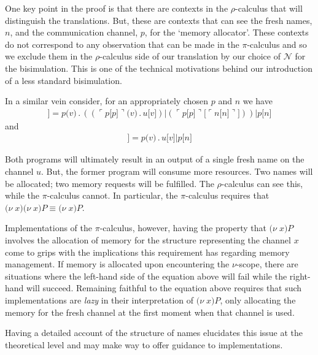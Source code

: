\documentclass[]{entcs}
\newcommand{\ldb}{[\![}
\newcommand{\rdb}{]\!]}
\newcommand{\lpquote}{\ulcorner}
\newcommand{\rpquote}{\urcorner}
\newcommand{\newkw}{\nu}
\newcommand{\id}[1]{\texttt{#1}}
\newcommand{\juxtap}{\mathbin{\id{|}}}
\newcommand{\concat}{\mathbin{.}}
\newcommand{\binpar}[2]{#1 \juxtap #2}
\newcommand{\outputp}[2]{#1 \id{[} #2 \id{]}}
\newcommand{\prefix}[3]{#1 \id{(} #2 \id{)} \concat #3}
\newcommand{\quotep}[1]{\lpquote #1 \rpquote}
\newcommand{\newp}[2]{\id{(}\newkw \; #1 \id{)} #2}
\newcommand{\meaningof}[1]{\ldb #1 \rdb}
\newcommand{\pic}{$\pi$-calculus}
\newcommand{\rhoc}{$\rho$-calculus}
\begin{document}
One key point in the proof is that there are contexts in the {\rhoc}
that will distinguish the translations. But, these are contexts that
can see the fresh names, $n$, and the communication channel, $p$, for
the `memory allocator'. These contexts do not correspond to any
observation that can be made in the {\pic} and so we exclude them in
the {\rhoc} side of our translation by our choice of ${\mathcal N}$
for the bisimulation. This is one of the technical motivations behind
our introduction of a less standard bisimulation.

\begin{example}
	In a similar vein consider, for an appropriately chosen $p$ and $n$ we have
	\begin{eqnarray}
		\meaningof{\newp{v}{\newp{v}{\outputp{u}{v}}}} = 
			\binpar{\prefix{p}{v}{(\binpar{(\prefix{\quotep{\outputp{p}{p}}}{v}{\outputp{u}{v}})}
					              {(\outputp{\quotep{\outputp{p}{p}}}{\quotep{\outputp{n}{n}}})})}}
			       {\outputp{p}{n}} \nonumber
	\end{eqnarray}
	and
	\begin{eqnarray}
		\meaningof{\newp{v}{\outputp{u}{v}}} = 
				\binpar	{\prefix{p}{v}{\outputp{u}{v}}}
			       		{\outputp{p}{n}} \nonumber
	\end{eqnarray}

	Both programs will ultimately result in an output of a single
	fresh name on the channel $u$. But, the former program will
	consume more resources. Two names will be allocated; two memory
	requests will be fulfilled. The {\rhoc} can see this, while the
	{\pic} cannot. In particular, the {\pic} requires that
	$\newp{x}{\newp{x}{P}} \equiv \newp{x}{P}$.

	Implementations of the {\pic}, however, having the property that
	${\newp{x}{P}}$ involves the allocation of memory for the
	structure representing the channel $x$ come to grips with the
	implications this requirement has regarding memory management. If
	memory is allocated upon encountering the $\nu$-scope, there are
	situations where the left-hand side of the equation above will
	fail while the right-hand will succeed. Remaining faithful to the
	equation above requires that such implementations are
	\textit{lazy} in their interpretation of ${\newp{x}{P}}$, only
	allocating the memory for the fresh channel at the first moment
	when that channel is used.

	Having a detailed account of the structure of names elucidates
	this issue at the theoretical level and may make way to offer
	guidance to implementations.
\end{example}
\end{document}
